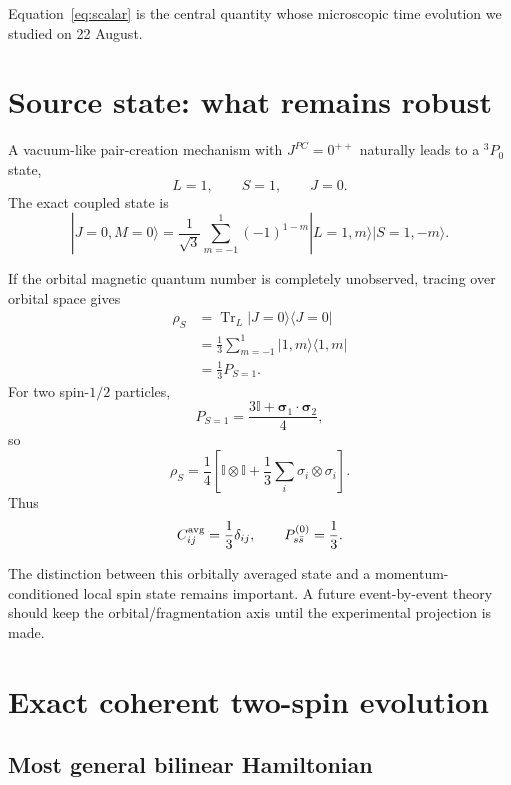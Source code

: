 \documentclass[11pt]{article}
\newcommand{\ssb}{s\bar s}
\newcommand{\Id}{\mathbb I}
\newcommand{\Trc}{\operatorname{Tr}}
\begin{document}
Equation~\eqref{eq:scalar} is the central quantity whose microscopic time evolution we studied on
22 August.

\section{Source state: what remains robust}

A vacuum-like pair-creation mechanism with $J^{PC}=0^{++}$ naturally leads to a ${}^3P_0$ state,
\begin{equation}
L=1,\qquad S=1,\qquad J=0.
\end{equation}
The exact coupled state is
\begin{equation}
|J=0,M=0\rangle
=
\frac{1}{\sqrt3}
\sum_{m=-1}^{1}
(-1)^{1-m}
|L=1,m\rangle
|S=1,-m\rangle .
\label{eq:3p0}
\end{equation}

If the orbital magnetic quantum number is completely unobserved, tracing over orbital space gives
\begin{align}
\rho_S
&=
\Trc_L |J=0\rangle\langle J=0|\\
&=
\frac13
\sum_{m=-1}^{1}
|1,m\rangle\langle1,m|\\
&=
\frac13 P_{S=1}.
\end{align}
For two spin-$1/2$ particles,
\begin{equation}
P_{S=1}
=
\frac{3\Id+\bm\sigma_1\cdot\bm\sigma_2}{4},
\end{equation}
so
\begin{equation}
\rho_S
=
\frac14
\left[
\Id\otimes\Id
+
\frac13
\sum_i\sigma_i\otimes\sigma_i
\right].
\end{equation}
Thus
\begin{equation}
C_{ij}^{\rm avg}
=
\frac13\delta_{ij},
\qquad
P_{\ssb}^{(0)}
=
\frac13.
\label{eq:p13}
\end{equation}

The distinction between this orbitally averaged state and a momentum-conditioned local spin state
remains important. A future event-by-event theory should keep the orbital/fragmentation axis until
the experimental projection is made.

\section{Exact coherent two-spin evolution}

\subsection{Most general bilinear Hamiltonian}
\end{document}
